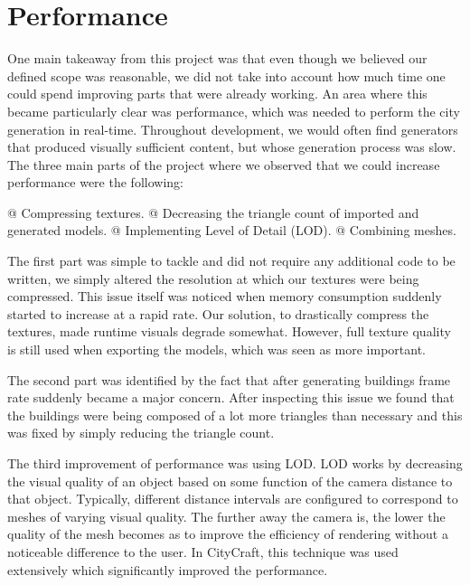 \section{Performance}

One main takeaway from this project was that even though we believed our defined scope was reasonable, we did not take into account how much time one could spend improving parts that were already working.
An area where this became particularly clear was performance, which was needed to perform the city generation in real-time.
Throughout development, we would often find generators that produced visually sufficient content, but whose generation process was slow. 
The three main parts of the project where we observed that we could increase performance were the following:

\begin{easylist}
  @ Compressing textures.
  @ Decreasing the triangle count of imported and generated models.
  @ Implementing Level of Detail (LOD).
  @ Combining meshes. 
\end{easylist}
 
The first part was simple to tackle and did not require any additional code to be written, we simply altered the resolution at which our textures were being compressed.
This issue itself was noticed when memory consumption suddenly started to increase at a rapid rate.
Our solution, to drastically compress the textures, made runtime visuals degrade somewhat.
However, full texture quality is still used when exporting the models, which was seen as more important.

The second part was identified by the fact that after generating buildings frame rate suddenly became a major concern. 
After inspecting this issue we found that the buildings were being composed of a lot more triangles than necessary and this was fixed by simply reducing the triangle count. 

The third improvement of performance was using LOD.
LOD works by decreasing the visual quality of an object based on some function of the camera distance to that object.
Typically, different distance intervals are configured to correspond to meshes of varying visual quality.
The further away the camera is, the lower the quality of the mesh becomes as to improve the efficiency of rendering without a noticeable difference to the user.
In CityCraft, this technique was used extensively which significantly improved the performance.

